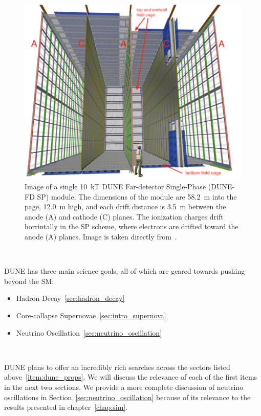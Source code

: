 \begin{figure}[]
\centering
\includegraphics[width=\textwidth]{images/dune_fd_10ktmodule_tdrv1.png}
\caption{Image of a single 10~\unit{kT} DUNE Far-detector Single-Phase (DUNE-FD SP) module.
The dimensions of the module are 58.2~\unit{m} into the page, 12.0~\unit{m} high, and each drift distance is 3.5~\unit{m} between the anode (A) and cathode (C) planes. 
The ionization charges drift horrintally in the SP scheme, where electrons are drifted toward the anode (A) planes.
Image is taken directly from~\citep{DUNE_TDR_V1_Abi_2020}.
}
\end{figure}~\label{fig:dune_10kt}


DUNE has three main science goals, all of which are geared towards pushing beyond the SM:

\begin{itemize}
    \item Hadron Decay~\ref{sec:hadron_decay}
    \item Core-collapse Supernovae~\ref{sec:intro_supernova}
    \item Neutrino Oscillation~\ref{sec:neutrino_oscillation}
\end{itemize}
~\label{item:dune_props}

DUNE plans to offer an incredibly rich searches across the sectors listed above~\ref{item:dune_props}.
We will discuss the relevance of each of the first items in the next two sections.
We provide a more complete discussion of neutrino oscillations in Section~\ref{sec:neutrino_oscillation} because of its relevance to the results presented in chapter~\ref{chap:sim}.


